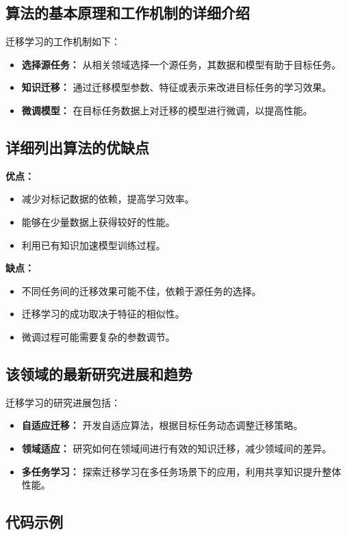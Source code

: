 \subsection*{算法的基本原理和工作机制的详细介绍}
迁移学习的工作机制如下：
\begin{itemize}
    \item \textbf{选择源任务：} 从相关领域选择一个源任务，其数据和模型有助于目标任务。
    \item \textbf{知识迁移：} 通过迁移模型参数、特征或表示来改进目标任务的学习效果。
    \item \textbf{微调模型：} 在目标任务数据上对迁移的模型进行微调，以提高性能。
\end{itemize}

\subsection*{详细列出算法的优缺点}
\textbf{优点：}
\begin{itemize}
    \item 减少对标记数据的依赖，提高学习效率。
    \item 能够在少量数据上获得较好的性能。
    \item 利用已有知识加速模型训练过程。
\end{itemize}

\textbf{缺点：}
\begin{itemize}
    \item 不同任务间的迁移效果可能不佳，依赖于源任务的选择。
    \item 迁移学习的成功取决于特征的相似性。
    \item 微调过程可能需要复杂的参数调节。
\end{itemize}

\subsection*{该领域的最新研究进展和趋势}
迁移学习的研究进展包括：
\begin{itemize}
    \item \textbf{自适应迁移：} 开发自适应算法，根据目标任务动态调整迁移策略。
    \item \textbf{领域适应：} 研究如何在领域间进行有效的知识迁移，减少领域间的差异。
    \item \textbf{多任务学习：} 探索迁移学习在多任务场景下的应用，利用共享知识提升整体性能。
\end{itemize}
\subsection*{代码示例}
\begin{lstlisting}

\end{lstlisting}


